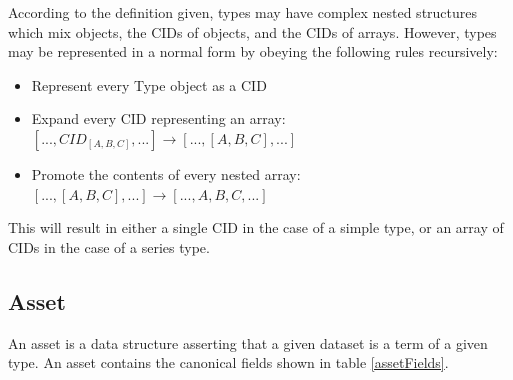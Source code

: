 \documentclass[9pt, oneside]{article}   	%
\begin{document}
\begin{multicols}{2}

According to the definition given, types may have complex nested structures which mix objects, the CIDs of objects, and the CIDs of arrays. However, types may be represented in a normal form by obeying the following rules recursively:

\begin{itemize}
\item Represent every Type object as a CID
\item Expand every CID representing an array: $[..., CID_{[A,B,C]}, ...] \rightarrow [..., [A,B,C], ...]$
\item Promote the contents of every nested array: $ [..., [A,B,C], ...] \rightarrow [..., A,B,C, ...]$
\end{itemize}

This will result in either a single CID in the case of a simple type, or an array of CIDs in the case of a series type.

\subsection{Asset}\label{asset}

An asset is a data structure asserting that a given dataset is a term of a given type. An asset contains the canonical fields shown in table \ref{assetFields}.


\end{multicols}
\end{document}
